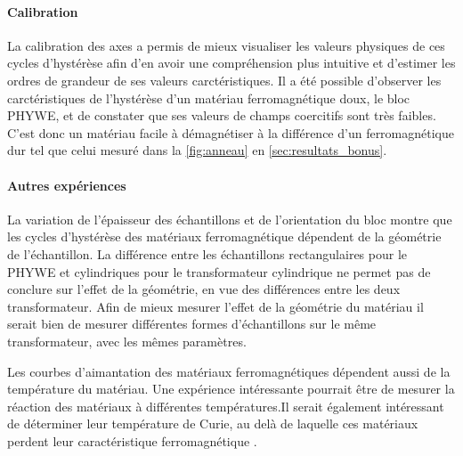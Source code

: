\paragraph*{Calibration}
La calibration des axes a permis de mieux visualiser les valeurs physiques de ces cycles d'hystérèse afin d'en avoir une compréhension plus intuitive et d'estimer les ordres de grandeur de ses valeurs carctéristiques. Il a été possible d'observer les carctéristiques de l'hystérèse d'un matériau ferromagnétique doux, le bloc PHYWE, et de constater que ses valeurs de champs coercitifs sont très faibles. C'est donc un matériau facile à démagnétiser à la différence d'un ferromagnétique dur tel que celui mesuré dans la \autoref{fig:anneau} en \autoref{sec:resultats_bonus}.

\paragraph*{Autres expériences}
La variation de l'épaisseur des échantillons et de l'orientation du bloc montre que les cycles d'hystérèse des matériaux ferromagnétique dépendent de la géométrie de l'échantillon. La différence entre les échantillons rectangulaires pour le PHYWE et cylindriques pour le transformateur cylindrique ne permet pas de conclure sur l'effet de la géométrie, en vue des différences entre les deux transformateur. Afin de mieux mesurer l'effet de la géométrie du matériau il serait bien de mesurer différentes formes d'échantillons sur le même transformateur, avec les mêmes paramètres.

Les courbes d'aimantation des matériaux ferromagnétiques dépendent aussi de la température du matériau. Une expérience intéressante pourrait être de mesurer la réaction des matériaux à différentes températures.Il serait également intéressant de déterminer leur température de Curie, au delà de laquelle ces matériaux perdent leur caractéristique ferromagnétique \cite{notice}.

